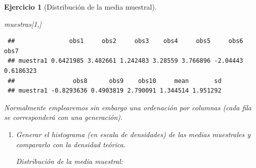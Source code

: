 \documentclass[
]{book}
\newenvironment{Shaded}{\begin{snugshade}}{\end{snugshade}}
\newcommand{\AttributeTok}[1]{\textcolor[rgb]{0.77,0.63,0.00}{#1}}
\newcommand{\CommentTok}[1]{\textcolor[rgb]{0.56,0.35,0.01}{\textit{#1}}}
\newcommand{\ConstantTok}[1]{\textcolor[rgb]{0.00,0.00,0.00}{#1}}
\newcommand{\DecValTok}[1]{\textcolor[rgb]{0.00,0.00,0.81}{#1}}
\newcommand{\FunctionTok}[1]{\textcolor[rgb]{0.00,0.00,0.00}{#1}}
\newcommand{\NormalTok}[1]{#1}
\newcommand{\SpecialCharTok}[1]{\textcolor[rgb]{0.00,0.00,0.00}{#1}}
\newcommand{\StringTok}[1]{\textcolor[rgb]{0.31,0.60,0.02}{#1}}
\theoremstyle{break}
\newtheorem{exercise}{Ejercicio}[chapter]
\theoremstyle{nonumberplain}
\renewcommand{\CommentTok}[1]{\textcolor[rgb]{0.41,0.41,0.41}{\texttt{#1}}}
\begin{document}
\begin{exercise}[Distribución de la media muestral]
\begin{enumerate}
\begin{Shaded}
\begin{Highlighting}[]
\NormalTok{muestras[}\DecValTok{1}\NormalTok{,]}
\end{Highlighting}
\end{Shaded}

\begin{verbatim}
 ##               obs1     obs2     obs3    obs4     obs5     obs6      obs7
 ## muestra1 0.6421985 3.482661 1.242483 3.28559 3.766896 -2.04443 0.6186323
 ##                obs8      obs9    obs10     mean       sd
 ## muestra1 -0.8293636 0.4903819 2.790091 1.344514 1.951292
\end{verbatim}
\end{enumerate}

Normalmente emplearemos sin embargo una ordenación por columnas (cada fila se corresponderá con una generación).

\begin{enumerate}
\def\labelenumi{\alph{enumi})}
\setcounter{enumi}{1}
\item
  Generar el histograma (en escala de densidades) de las medias
  muestrales y compararlo con la densidad teórica.

  Distribución de la media muestral:

\begin{Shaded}
\end{Shaded}


\end{enumerate}
\end{exercise}
\end{document}

